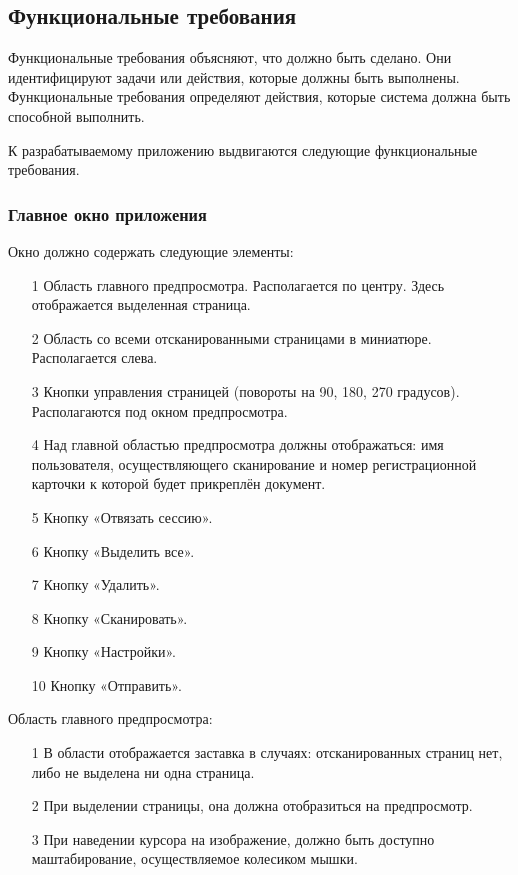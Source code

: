 \subsection{Функциональные требования}
\label{sub:requirements:func_rec}

Функциональные требования объясняют, что должно быть сделано. Они идентифицируют задачи или действия, которые должны быть выполнены. Функциональные требования определяют действия, которые система должна быть способной выполнить.

К разрабатываемому приложению выдвигаются следующие функциональные требования.

\subsubsection{Главное окно приложения }
\label{sub:requirements:func_rec:main_window}

Окно должно содержать следующие элементы:
\begin{enumerate}
	\item[1] Область главного предпросмотра. Располагается по центру. Здесь отображается выделенная страница.
	\item[2] Область со всеми отсканированными страницами в миниатюре. Располагается слева.
	\item[3] Кнопки управления страницей (повороты на 90, 180, 270 градусов). Располагаются под окном предпросмотра.
	\item[4] Над главной областью предпросмотра должны отображаться: имя пользователя, осуществляющего сканирование и номер регистрационной карточки к которой будет прикреплён документ.
	\item[5] Кнопку «Отвязать сессию».
	\item[6] Кнопку «Выделить все».
	\item[7] Кнопку «Удалить».
	\item[8] Кнопку «Сканировать».
	\item[9] Кнопку «Настройки».
	\item[10] Кнопку «Отправить».
\end{enumerate}

Область главного предпросмотра: 
\begin{enumerate}
	\item[1] В области отображается заставка в случаях: отсканированных страниц нет, либо не выделена ни одна страница.
  	\item[2] При выделении страницы, она должна отобразиться на предпросмотр.
 	\item[3] При наведении курсора на изображение, должно быть доступно маштабирование, осуществляемое колесиком мышки.
\end{enumerate}

